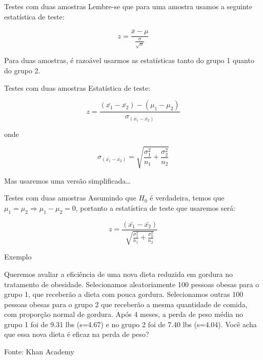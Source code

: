 \documentclass{beamer}
\begin{document}
\begin{frame}{Testes com duas amostras}
Lembre-se que para uma amostra usamos a seguinte estatística de teste:

\begin{displaymath}
  z = \frac{\bar{x} - \mu}{\frac{\sigma}{\sqrt{n}}}
\end{displaymath}

Para duas amostras, é razoável usarmos as estatísticas tanto do grupo
1 quanto do grupo 2.
\end{frame}

\begin{frame}{Testes com duas amostras}
Estatística de teste:

\begin{displaymath}
  z = \frac{ (\bar{x_1} - \bar{x_2}) - (\mu_1 - \mu_2)
  }{\sigma_{(\bar{x_1} - \bar{x_2})}}
\end{displaymath}

onde 

\begin{displaymath}
  \sigma_{(\bar{x_1} - \bar{x_2})} = \sqrt{\frac{\sigma_1^2}{n_1} + \frac{\sigma^2_2}{n_2}}
\end{displaymath}

Mas usaremos uma versão simplificada\ldots
\end{frame}

\begin{frame}{Testes com duas amostras}
  Assumindo que $H_0$ é verdadeira, temos que $\mu_1=\mu_2 \Rightarrow
  \mu_1-\mu_2 = 0$, portanto a estatística de teste que usaremos será:

\begin{displaymath}
  z = \frac{ (\bar{x_1} - \bar{x_2}) }{\sqrt{\frac{\sigma_1^2}{n_1} + \frac{\sigma^2_2}{n_2}}}
\end{displaymath}

\end{frame}

\begin{frame}{Exemplo}
  \begin{example}
    Queremos avaliar a eficiência de uma nova dieta reduzida em
    gordura no tratamento de obesidade. Selecionamos aleatoriamente
    100 pessoas obesas para o grupo 1, que receberão a dieta com pouca
    gordura. Selecionamos outras 100 pessoas obesas para o grupo 2 que
    receberão a mesma quantidade de comida, com proporção normal de
    gordura. Após 4 meses, a perda de peso média no grupo 1 foi de
    9.31 lbs (s=4.67) e no grupo 2 foi de 7.40 lbs (s=4.04). Você acha
    que essa nova dieta é eficaz na perda de peso?
  \end{example}
  Fonte: Khan Academy
\end{frame}
\end{document}
